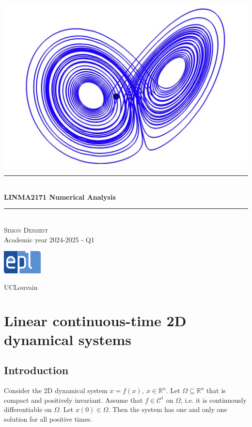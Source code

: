 \documentclass[12pt, openany]{report}
\theoremstyle{definition}
\newcommand{\HRule}{\rule{\linewidth}{0.5mm}}
\begin{document}
\begin{titlepage}
    \begin{sffamily}
    \begin{center}
        \includegraphics[scale=0.25]{img/page_de_garde.png} \\[1cm]
        \HRule \\[0.4cm]
        { \huge \bfseries LINMA2171 Numerical Analysis \\[0.4cm] }
    
        \HRule \\[1.5cm]
        \textsc{\LARGE Simon Desmidt}\\[1cm]
        \vfill
        \vspace{2cm}
        {\large Academic year 2024-2025 - Q1}
        \vspace{0.4cm}
         
        \includegraphics[width=0.15\textwidth]{img/epl.png}
        
        UCLouvain\\
    
    \end{center}
    \end{sffamily}
\end{titlepage}

\setcounter{tocdepth}{1}
\tableofcontents
\chapter{Linear continuous-time 2D dynamical systems}
\section{Introduction}
Consider the 2D dynamical system \(\dot x=f(x),\: x\in \mathbb{R}^n\). Let \(\Omega \subseteq \mathbb{R}^n\) that is compact and positively invariant. Assume that \(f\in \mathcal{C}^1\) on \(\Omega\), i.e. it is continuously differentiable on \(\Omega\). Let \(x(0)\in \Omega\). Then the system has one and only one solution for all positive times. \\
\end{document}
